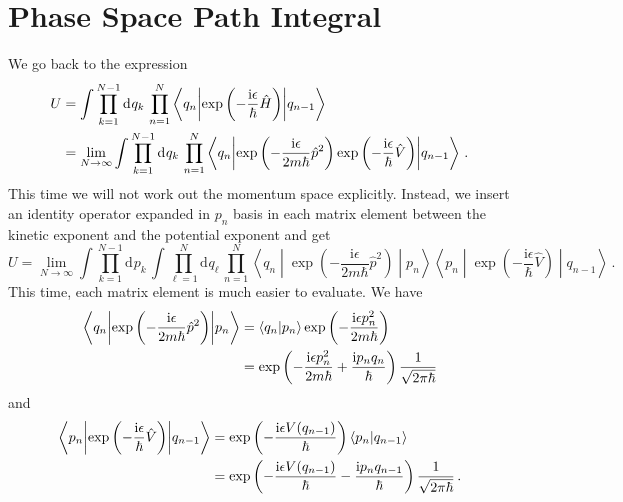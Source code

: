 \documentclass{article}
\theoremstyle{plain}\theoremheaderfont{\normalfont\itshape}\theorembodyfont{\rmfamily}\theoremseparator{.}\newtheorem*{rem}{Remark}\newtheorem*{ex}{Example}\newtheorem*{proof}{Proof}\newtheorem*{altp}{Alternative proof}
\theoremstyle{plain}\theoremheaderfont{\normalfont\bfseries}\theorembodyfont{\rmfamily}\theoremseparator{.}\newtheorem{thm}{Theorem}[section]\newtheorem{lem}[thm]{Lemma}\newtheorem{prop}[thm]{Proposition}\newtheorem*{cor}{Corollary}\newtheorem{defn}[thm]{Definition}\newtheorem{clm}[thm]{Claim}\newtheorem{clminproof}{Claim}
\theoremstyle{break}\theoremheaderfont{\normalfont\itshape}\theorembodyfont{\rmfamily}\theoremseparator{.\medskip}\newtheorem*{proofskip}{Proof}\newtheorem*{exs}{Examples}\newtheorem*{rems}{Remarks}
\theoremstyle{break}\theoremheaderfont{\normalfont\bfseries}\theorembodyfont{\rmfamily}\theoremseparator{.\medskip}\newtheorem{lemskip}[thm]{Lemma}\newtheorem{defnskip}[thm]{Definition}\newtheorem{propskip}[thm]{Proposition}\newtheorem{thmskip}[thm]{Theorem}
\numberwithin{equation}{section}
\newcommand{\ii}{\mathrm{i}}
\newcommand{\dd}[2][]{\mathrm{d}^{#1} #2\,}
\newcommand{\braket}[2]{\left\langle #1 \middle| #2 \right\rangle}
\newcommand{\mel}[3]{\left\langle #1 \middle| #2 \middle| #3 \right\rangle}
\begin{document}
    \section{Phase Space Path Integral}
    We go back to the expression
    \begin{align}
        U&=\int\prod_{k=1}^{N-1}\dd{q_k} \prod_{n=1}^{N}\mel{q_n}{\exp\left(-\frac{\ii \epsilon}{\hbar}\hat{H}\right)}{q_{n-1}}\notag \\
        &=\lim_{N\to\infty}\int\prod_{k=1}^{N-1}\dd{q_k} \prod_{n=1}^{N}\mel{q_n}{\exp\left(-\frac{\ii \epsilon}{2m\hbar}\hat{p}^2\right)\exp\left(-\frac{\ii\epsilon}{\hbar}\hat{V}\right)}{q_{n-1}}\,.
    \end{align}
    This time we will not work out the momentum space explicitly. Instead, we insert an identity operator expanded in \(p_n\) basis in each matrix element between the kinetic exponent and the potential exponent and get
    \begin{equation}
        U=\lim_{N\to\infty}\int\prod_{k=1}^{N-1}\dd{p_k}\int\prod_{\ell=1}^{N}\dd{q_\ell}\prod_{n=1}^{N}\mel{q_n}{\exp\left(-\frac{\ii\epsilon}{2m\hbar}\hat{p}^2\right)}{p_n}\mel{p_n}{\exp\left(-\frac{\ii\epsilon}{\hbar}\hat{V}\right)}{q_{n-1}}\,.
    \end{equation}
    This time, each matrix element is much easier to evaluate. We have
    \begin{align}
        \mel{q_n}{\exp\left(-\frac{\ii\epsilon}{2m\hbar}\hat{p}^2\right)}{p_n}&=\braket{q_n}{p_n}\exp\left(-\frac{\ii\epsilon p_n^2}{2m\hbar}\right)\notag \\
        &=\exp\left(-\frac{\ii\epsilon p_n^2}{2m\hbar}+\frac{\ii p_n q_n}{\hbar}\right)\frac{1}{\sqrt{2\pi\hbar}}
    \end{align}
    and
    \begin{align}
        \mel{p_n}{\exp\left(-\frac{\ii\epsilon}{\hbar}\hat{V}\right)}{q_{n-1}}&=\exp\left(-\frac{\ii\epsilon V(q_{n-1})}{\hbar}\right)\braket{p_n}{q_{n-1}}\notag \\
        &=\exp\left(-\frac{\ii\epsilon V(q_{n-1})}{\hbar} - \frac{\ii p_n q_{n-1}}{\hbar}\right)\frac{1}{\sqrt{2\pi\hbar}}\,.
    \end{align}
\end{document}
